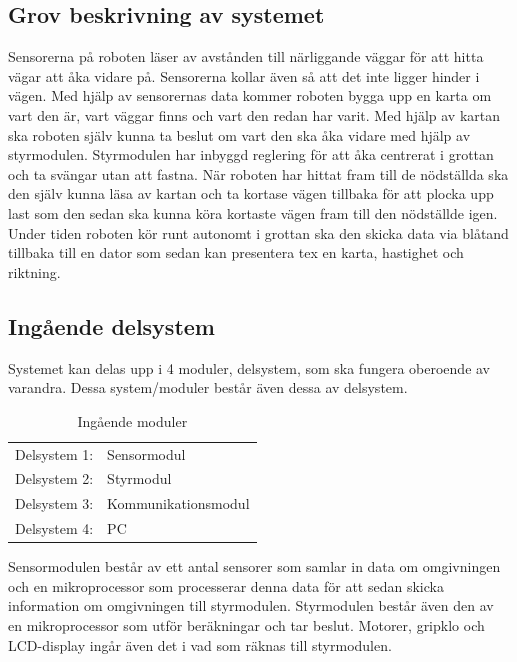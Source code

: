 \documentclass[11pt]{article}
\begin{document}
\begin{flushleft}
\subsection{Grov beskrivning av systemet}
Sensorerna på roboten läser av avstånden till närliggande väggar för att hitta vägar att åka vidare på. Sensorerna kollar även så att det inte ligger hinder i vägen. Med hjälp av sensorernas data kommer roboten bygga upp en karta om vart den är, vart väggar finns och vart den redan har varit. Med hjälp av kartan ska roboten själv kunna ta beslut om vart den ska åka vidare med hjälp av styrmodulen.
Styrmodulen har inbyggd reglering för att åka centrerat i grottan och ta svängar utan att fastna. När roboten har hittat fram till de nödställda ska den själv kunna läsa av kartan och ta kortase vägen tillbaka för att plocka upp last som den sedan ska kunna köra kortaste vägen fram till den nödställde igen. Under tiden roboten kör runt autonomt i grottan ska den skicka data via blåtand tillbaka till en dator som sedan kan presentera tex en karta, hastighet och riktning.    
 
\subsection{Ingående delsystem}
Systemet kan delas upp i 4 moduler, delsystem, som ska fungera oberoende av varandra. Dessa system/moduler består även dessa av delsystem.


\begin{table}[ht]

\centering
\begin{tabular}{c l}
Delsystem 1:&
Sensormodul \\

Delsystem 2:&
Styrmodul \\

Delsystem 3:&
Kommunikationsmodul \\

Delsystem 4:&
PC \\
\end{tabular}
\caption{Ingående moduler}
\label{tab:Moduler}
\end{table}


\bigskip

Sensormodulen består av ett antal sensorer som samlar in data om omgivningen och en mikroprocessor som processerar denna data för att sedan skicka information om omgivningen till styrmodulen. Styrmodulen består även den av en mikroprocessor som utför beräkningar och tar beslut. Motorer, gripklo och LCD-display ingår även det i vad som räknas till styrmodulen.


\end{flushleft}
\end{document}
